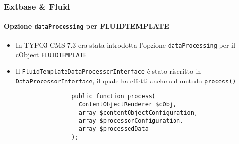 \begin{frame}[fragile]
	\frametitle{Extbase \& Fluid}
	\framesubtitle{Opzione \texttt{dataProcessing} per FLUIDTEMPLATE}

	\lstset{basicstyle=\tiny\ttfamily}

	\begin{itemize}

		\item In TYPO3 CMS 7.3 era stata introdotta l'opzione \texttt{dataProcessing} per il cObject \texttt{FLUIDTEMPLATE}

		\item Il \texttt{FluidTemplateDataProcessorInterface} è stato riscritto in \texttt{DataProcessorInterface},
			il quale ha effetti anche sul metodo \texttt{process()}

			\begin{lstlisting}
				public function process(
				  ContentObjectRenderer $cObj,
				  array $contentObjectConfiguration,
				  array $processorConfiguration,
				  array $processedData
				);
			\end{lstlisting}

	\end{itemize}

	\breakingchange

\end{frame}

